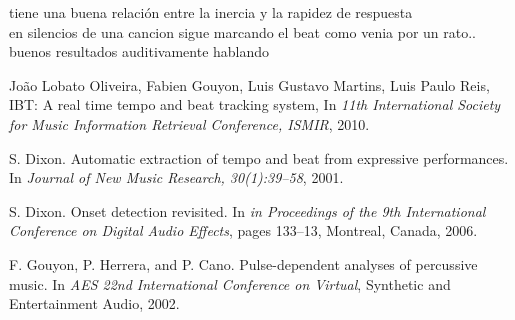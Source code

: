 \documentclass[12pt,a4paper,titlepage]{report}
\begin{document}
tiene una buena relación entre la inercia y la rapidez de respuesta\\

en silencios de una cancion sigue marcando el beat como venia por un rato..\\

buenos resultados auditivamente hablando\\


\begin{thebibliography}{99}
\begin{small}

Jo\~ao Lobato Oliveira, Fabien Gouyon, Luis Gustavo Martins, Luis Paulo Reis, IBT: A real time tempo and beat tracking system, In \emph{11th International Society for Music Information Retrieval Conference, ISMIR}, 2010.

S. Dixon. Automatic extraction of tempo and beat from
expressive performances. In \emph{Journal of New Music Research, 30(1):39–58}, 2001.

S. Dixon. Onset detection revisited. In \emph{in Proceedings of the 9th International Conference on Digital Audio Effects}, pages 133–13, Montreal, Canada, 2006.

F. Gouyon, P. Herrera, and P. Cano. Pulse-dependent analyses of percussive music. In \emph{AES 22nd International Conference on Virtual}, Synthetic and Entertainment Audio, 2002.

\end{small}
\end{thebibliography}
\end{document}
